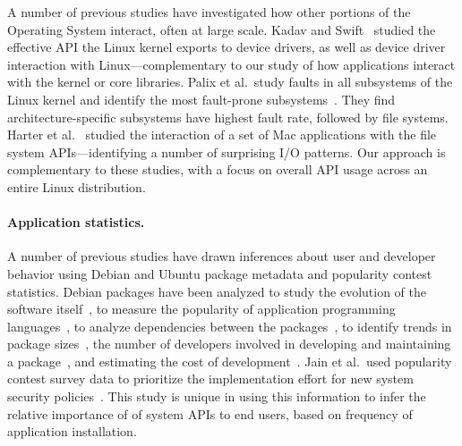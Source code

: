 A number of previous studies have investigated how other portions of the Operating System
interact, often at large scale.
Kadav and Swift~\citep{understand-drivers} studied the effective API the Linux kernel exports 
to device drivers, as well as device driver interaction with Linux---complementary to our study
of how applications interact with the kernel or core libraries.
Palix et al.\ study faults in all subsystems of the Linux kernel and identify the 
most fault-prone subsystems~\citep{linux-faults}.
They find architecture-specific subsystems have highest fault rate, followed by file systems.
Harter et al.~\citep{file-not-file} studied
 the interaction of a set of Mac \osx{} applications with the file system APIs---identifying a number
of surprising I/O patterns.
Our approach is complementary to these studies, with a focus on overall API 
usage across an entire Linux distribution.



\paragraph{Application statistics.}
A number of previous studies have drawn inferences about user and developer behavior
using Debian and Ubuntu package metadata and popularity contest statistics.
Debian packages have been analyzed to study the evolution 
of the software itself~\citep{macro-study, life-death, mining-over-time}, 
to measure the popularity of application programming 
languages~\citep{upgrade-libre}, to analyze dependencies between the packages~\citep{package-dependency}, 
to identify trends in package sizes~\citep{pigs-to-stripes}, 
the number of developers involved in developing and maintaining a package~\citep{toy-story},
and estimating the cost of development~\citep{measuring-woody}.
Jain et al.\ used popularity contest survey data to 
prioritize the implementation effort for new system security policies~\citep{jain14setuid}. %
This study is unique in using this information to infer the relative importance of 
of system APIs to end users, based on frequency of application installation.

